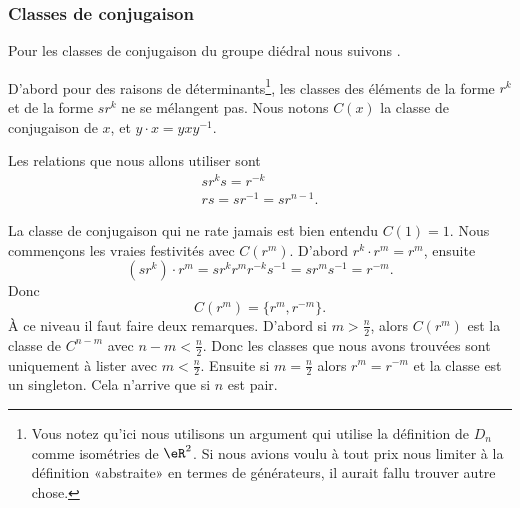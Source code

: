\subsubsection{Classes de conjugaison}
\label{subsubsecZQnBcgo}

Pour les classes de conjugaison du groupe diédral nous suivons \cite{HRIMAJJ}.

D'abord pour des raisons de déterminants\footnote{Vous notez qu'ici nous utilisons un argument qui utilise la définition de \( D_n\) comme isométries de \( \eR^2\). Si nous avions voulu à tout prix nous limiter à la définition «abstraite» en termes de générateurs, il aurait fallu trouver autre chose.}, les classes des éléments de la forme \( r^k\) et de la forme \( sr^k\) ne se mélangent pas. Nous notons \( C(x)\) la classe de conjugaison de \( x\), et \( y\cdot x=yxy^{-1}\).

Les relations que nous allons utiliser sont
\begin{subequations}
	\begin{align}
		sr^ks=r^{-k} \\
		rs=sr^{-1}=sr^{n-1}.
	\end{align}
\end{subequations}

La classe de conjugaison qui ne rate jamais est bien entendu \( C(1)={1}\). Nous commençons les vraies festivités avec \( C(r^{m})\). D'abord \( r^k\cdot r^m=r^m\), ensuite
\begin{equation}
	(sr^k)\cdot r^m=sr^kr^mr^{-k}s^{-1}=sr^ms^{-1}=r^{-m}.
\end{equation}
Donc
\begin{equation}    \label{EqVFfFxgi}
	C(r^m)=\{ r^m,r^{-m} \}.
\end{equation}
À ce niveau il faut faire deux remarques. D'abord si \( m>\frac{ n }{2}\), alors \( C(r^m)\) est la classe de \( C^{n-m}\) avec \( n-m<\frac{ n }{2}\). Donc les classes que nous avons trouvées sont uniquement à lister avec \( m<\frac{ n }{2}\). Ensuite si \( m=\frac{ n }{2}\) alors \( r^m=r^{-m}\) et la classe est un singleton. Cela n'arrive que si \( n\) est pair.

